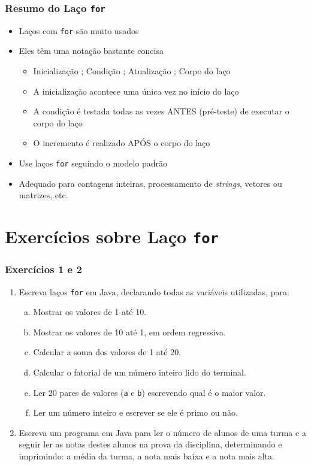 \documentclass[xcolor={dvipsnames,table},aspectratio=169]{beamer}
\begin{document}
\begin{frame}\frametitle{Resumo do Laço \texttt{for}}
\begin{itemize}
	\item Laços com \texttt{for} são muito usados
	\item Eles têm uma notação bastante concisa
	\begin{itemize}
		\item Inicialização ; Condição ; Atualização ; Corpo do laço
		\item A inicialização acontece uma única vez no início do laço
		\item A condição é testada todas as vezes ANTES (pré-teste) de executar o corpo do laço
		\item O incremento é realizado APÓS o corpo do laço
	\end{itemize}
	\item Use laços \texttt{for} seguindo o modelo padrão
	\item Adequado para contagens inteiras, processamento de \emph{strings}, vetores ou matrizes, etc.
\end{itemize}
\end{frame}

\section{Exercícios sobre Laço \texttt{for}}

\begin{frame}\frametitle{Exercícios 1 e 2}
\begin{enumerate}
    \item Escreva laços \texttt{for} em Java, declarando todas as variáveis utilizadas, para:
    \begin{enumerate}[a.]
        \item Mostrar os valores de 1 até 10.
        \item Mostrar os valores de 10 até 1, em ordem regressiva.
        \item Calcular a soma dos valores de 1 até 20.
        \item Calcular o fatorial de um número inteiro lido do terminal.
        \item Ler 20 pares de valores (\texttt{a} e \texttt{b}) escrevendo qual é o maior valor.
        \item Ler um número inteiro e escrever se ele é primo ou não.
    \end{enumerate}
    \item Escreva um programa em Java para ler o número de alunos de uma turma e a seguir ler as notas destes alunos na prova da disciplina, determinando e imprimindo: a média da turma, a nota mais baixa e a nota mais alta.
\end{enumerate}
\end{frame}
\end{document}
